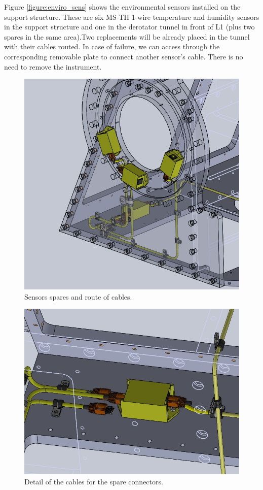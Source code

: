 \documentclass{report}
\begin{document}
Figure \ref{figure:enviro_sens} shows the environmental sensors installed on the support structure. These are six MS-TH 1-wire temperature and humidity sensors in the support structure and one in the derotator tunnel in front of L1 (plus two spares in the same area).Two replacements will be already placed in the tunnel with their cables routed. In case of failure, we can access through the corresponding removable plate to connect another sensor’s cable. There is no need to remove the instrument. 

\begin{figure}
\begin{center}
\includegraphics[width=0.7\linewidth]{figures/SensorsSPARES_2}
\end{center}
\caption{Sensors spares and route of cables.}
\label{figure:SensorsSP_1a}
\end{figure}

\begin{figure}
\begin{center}
\includegraphics[width=0.7\linewidth]{figures/SensorsSPARES_1}
\end{center}
\caption{Detail of the cables for the spare connectors.}
\label{figure:SensorsSP_1b}
\end{figure}
\end{document}
